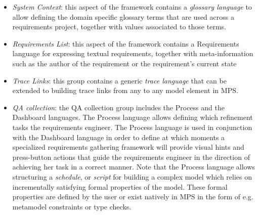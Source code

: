 \begin{itemize}
  \item \emph{System Context}: this aspect of the framework contains a
  \emph{glossary language} to allow defining the domain specific glossary terms that are used across a
  requirements project, together with values associated to those
  terms.
  \item \emph{Requirements List}: this aspect of the framework contains a
  \textsf{Requirements} language for expressing textual requirements, together with meta-information
  such as the author of the requirement or the requirement's current state
  \item \emph{Trace Links}: this group contains a generic \emph{trace
  language} that can be extended to building trace links from any to any model
  element in MPS.
  \item \emph{QA collection}: the QA collection group includes the
  \textsf{Process} and the \textsf{Dashboard} languages. The \textsf{Process}
  language allows defining which refinement tasks the requirements engineer.
  The \textsf{Process} language is used in conjunction with the
  \textsf{Dashboard} language in order to define at which moments a specialized requirements
  gathering framework will provide visual hints and press-button actions that
  guide the requirements engineer in the direction of achieving her task in a
  correct manner. Note that the \textsf{Process} language allows structuring a
  \emph{schedule}, or \emph{script} for building a complex model which relies on
  incrementally satisfying formal properties of the model. These formal
  properties are defined by the user or exist natively in MPS in the form of
  e.g. metamodel constraints or type checks.
\end{itemize}

